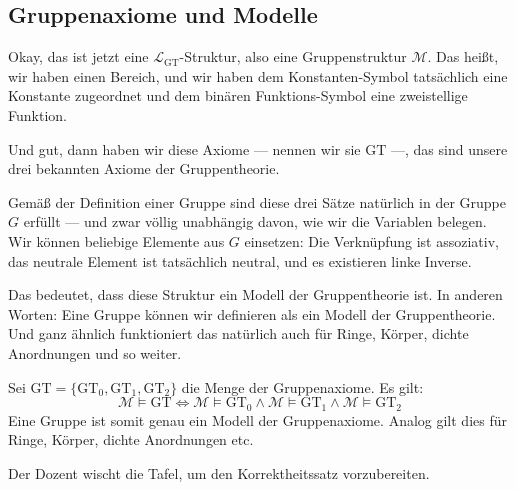 \subsection{Gruppenaxiome und Modelle}
\begin{spoken-clean}[00:13:50 - 00:15:47]
Okay, das ist jetzt eine $\mathcal{L}_{\text{GT}}$-Struktur, also eine Gruppenstruktur $\mathcal{M}$. Das heißt, wir haben einen Bereich, und wir haben dem Konstanten-Symbol tatsächlich eine Konstante zugeordnet und dem binären Funktions-Symbol eine zweistellige Funktion.

Und gut, dann haben wir diese Axiome --- nennen wir sie $\text{GT}$ ---, das sind unsere drei bekannten Axiome der Gruppentheorie.

Gemäß der Definition einer Gruppe sind diese drei Sätze natürlich in der Gruppe $G$ erfüllt --- und zwar völlig unabhängig davon, wie wir die Variablen belegen. Wir können beliebige Elemente aus $G$ einsetzen: Die Verknüpfung ist assoziativ, das neutrale Element ist tatsächlich neutral, und es existieren linke Inverse.

Das bedeutet, dass diese Struktur ein Modell der Gruppentheorie ist. In anderen Worten: Eine Gruppe können wir definieren als ein Modell der Gruppentheorie. Und ganz ähnlich funktioniert das natürlich auch für Ringe, Körper, dichte Anordnungen und so weiter.
\end{spoken-clean}

\begin{math-stroke}
Sei $\text{GT} = \{\text{GT}_0, \text{GT}_1, \text{GT}_2\}$ die Menge der Gruppenaxiome. Es gilt:
\[ \mathcal{M} \models \text{GT} \iff \mathcal{M} \models \text{GT}_0 \land \mathcal{M} \models \text{GT}_1 \land \mathcal{M} \models \text{GT}_2 \]
Eine Gruppe ist somit genau ein Modell der Gruppenaxiome. Analog gilt dies für Ringe, Körper, dichte Anordnungen etc.
\end{math-stroke}

\begin{ai-global-state-checkpoint-invisible-content}
\end{ai-global-state-checkpoint-invisible-content}

\begin{lecture-break}[Tafelreinigung]
Der Dozent wischt die Tafel, um den Korrektheitssatz vorzubereiten.
\end{lecture-break}

